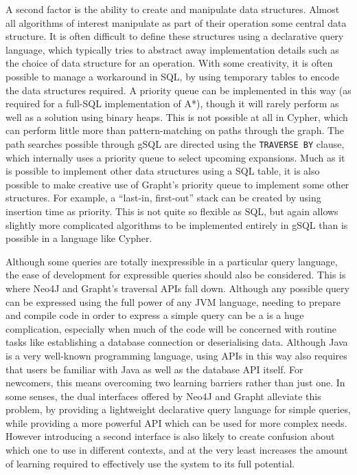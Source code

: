 A second factor is the ability to create and manipulate data structures. Almost all
algorithms of interest manipulate as part of their operation some central data
structure. It is often difficult to define these structures using  a
declarative query language, which typically tries to abstract away
implementation details such as the choice of data structure for an operation.
With some creativity, it is often possible to manage a workaround in SQL, by
using temporary tables to encode the data structures required. A priority
queue can be implemented in this way (as required for a full-SQL
implementation of A*), though it will rarely perform as well as a solution
using binary heaps. This is not possible at all in Cypher, which can perform
little  more than pattern-matching on paths through the graph. The path
searches possible through gSQL are directed using the \texttt{TRAVERSE BY}
clause, which internally uses a priority queue to select upcoming expansions.
Much as it is possible to implement other data structures using a SQL table,
it is also possible to make creative use of Grapht's priority queue to
implement some other structures. For example, a ``last-in, first-out'' stack
can be created by using insertion time as priority. This is not quite so
flexible as SQL, but again allows slightly more complicated algorithms to be
implemented entirely in gSQL than is possible in a language like Cypher.

Although some queries are totally inexpressible in a particular query
language, the ease of development for expressible queries should also be
considered. This is where Neo4J and Grapht's traversal APIs fall down.
Although any possible query can be expressed using the full power of any JVM
language, needing to prepare and compile code in order to express a simple
query can be a is a huge complication, especially when much of the code will
be concerned with routine tasks like establishing a database connection or
deserialising data. Although Java is a very well-known programming language,
using APIs in this way also requires that users be familiar with Java as well
as the database API itself. For newcomers, this means overcoming two learning
barriers rather than just one. In some senses, the dual interfaces offered by
Neo4J and Grapht alleviate this problem, by providing a lightweight
declarative query language for simple queries, while providing a more powerful
API which can be used for more complex needs. However introducing a second
interface is also likely to create confusion about which one to use in
different contexts, and at the very least increases the amount of learning
required to effectively use the system to its full potential.

